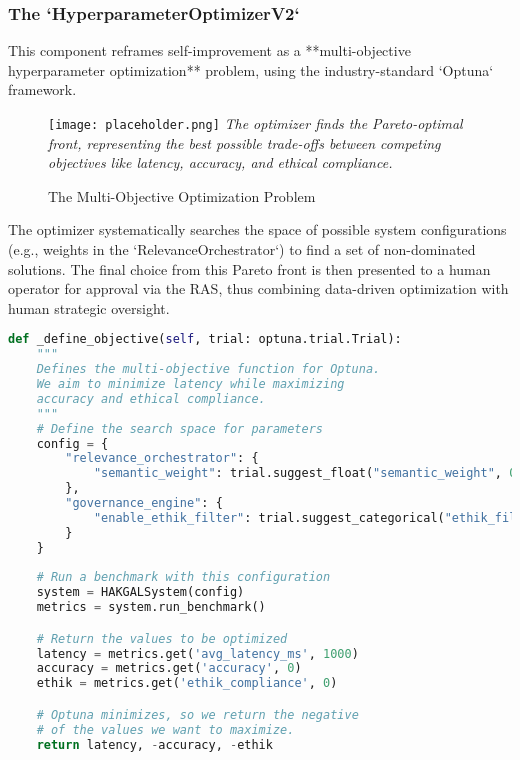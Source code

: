 \documentclass[11pt, a4paper]{article}
\begin{document}
\subsubsection{The `HyperparameterOptimizerV2`}
This component reframes self-improvement as a **multi-objective hyperparameter optimization** problem, using the industry-standard `Optuna` framework.

\begin{figure}[h]
    \centering
    \caption{The Multi-Objective Optimization Problem}
    \texttt{[image: placeholder.png]} %
    \label{fig:pareto}
    \small \textit{The optimizer finds the Pareto-optimal front, representing the best possible trade-offs between competing objectives like latency, accuracy, and ethical compliance.}
\end{figure}

The optimizer systematically searches the space of possible system configurations (e.g., weights in the `RelevanceOrchestrator`) to find a set of non-dominated solutions. The final choice from this Pareto front is then presented to a human operator for approval via the RAS, thus combining data-driven optimization with human strategic oversight.

\begin{lstlisting}[language=Python, caption={The Optuna Objective Function}, label={lst:optuna}]
def _define_objective(self, trial: optuna.trial.Trial):
    """
    Defines the multi-objective function for Optuna.
    We aim to minimize latency while maximizing
    accuracy and ethical compliance.
    """
    # Define the search space for parameters
    config = {
        "relevance_orchestrator": {
            "semantic_weight": trial.suggest_float("semantic_weight", 0.1, 0.9),
        },
        "governance_engine": {
            "enable_ethik_filter": trial.suggest_categorical("ethik_filter", [True, False]),
        }
    }
    
    # Run a benchmark with this configuration
    system = HAKGALSystem(config)
    metrics = system.run_benchmark()

    # Return the values to be optimized
    latency = metrics.get('avg_latency_ms', 1000)
    accuracy = metrics.get('accuracy', 0)
    ethik = metrics.get('ethik_compliance', 0)

    # Optuna minimizes, so we return the negative
    # of the values we want to maximize.
    return latency, -accuracy, -ethik
\end{lstlisting}
\end{document}
